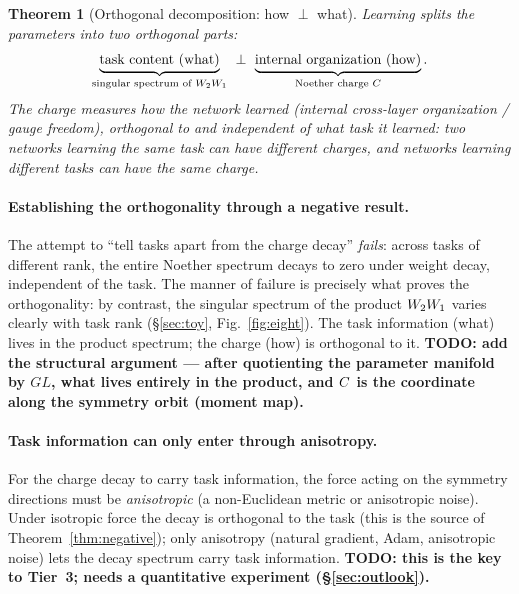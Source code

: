 \documentclass[11pt]{article}
\newtheorem{Theorem}{Theorem}[section]
\begin{document}
\begin{Theorem}[Orthogonal decomposition: how $\perp$ what]\label{thm:orthogonal}
Learning splits the parameters into two orthogonal parts:
\[
  \underbrace{\text{task content (what)}}_{\text{singular spectrum of } W_2W_1}
  \ \perp\
  \underbrace{\text{internal organization (how)}}_{\text{Noether charge } C}.
\]
The charge measures \emph{how} the network learned (internal cross-layer organization / gauge
freedom), orthogonal to and independent of \emph{what} task it learned: two networks learning the
same task can have different charges, and networks learning different tasks can have the same charge.
\end{Theorem}

\paragraph{Establishing the orthogonality through a negative result.}
The attempt to ``tell tasks apart from the charge decay'' \emph{fails}: across tasks of different
rank, the entire Noether spectrum decays to zero under weight decay, independent of the task. The
manner of failure is precisely what proves the orthogonality: by contrast, the singular spectrum of
the product $W_2W_1$ varies clearly with task rank (\S\ref{sec:toy}, Fig.~\ref{fig:eight}). The
task information (what) lives in the product spectrum; the charge (how) is orthogonal to it.
\textbf{TODO: add the structural argument --- after quotienting the parameter manifold by $GL$, what
lives entirely in the product, and $C$ is the coordinate along the symmetry orbit (moment map).}

\paragraph{Task information can only enter through anisotropy.}
For the charge decay to carry task information, the force acting on the symmetry directions must be
\emph{anisotropic} (a non-Euclidean metric or anisotropic noise). Under isotropic force the decay is
orthogonal to the task (this is the source of Theorem~\ref{thm:negative}); only anisotropy (natural
gradient, Adam, anisotropic noise) lets the decay spectrum carry task information.
\textbf{TODO: this is the key to Tier~3; needs a quantitative experiment (\S\ref{sec:outlook}).}
\end{document}
